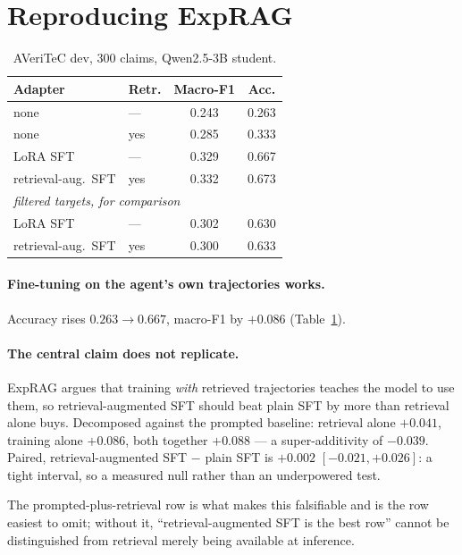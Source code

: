 \documentclass[11pt]{article}
\begin{document}
\section{Reproducing ExpRAG}
\label{sec:exprag}

\begin{table}[t]
\centering\small
\begin{tabular}{llcc}
\toprule
Adapter & Retr. & Macro-F1 & Acc. \\
\midrule
none            & --- & 0.243 & 0.263 \\
none            & yes & 0.285 & 0.333 \\
LoRA SFT        & --- & 0.329 & 0.667 \\
retrieval-aug.\ SFT & yes & 0.332 & 0.673 \\
\midrule
\multicolumn{4}{l}{\emph{filtered targets, for comparison}} \\
LoRA SFT        & --- & 0.302 & 0.630 \\
retrieval-aug.\ SFT & yes & 0.300 & 0.633 \\
\bottomrule
\end{tabular}
\caption{AVeriTeC dev, 300 claims, Qwen2.5-3B student.}
\label{tab:exprag}
\end{table}

\paragraph{Fine-tuning on the agent's own trajectories works.} Accuracy rises
$0.263 \rightarrow 0.667$, macro-F1 by $+0.086$ (Table~\ref{tab:exprag}).

\paragraph{The central claim does not replicate.} ExpRAG argues that training
\emph{with} retrieved trajectories teaches the model to use them, so
retrieval-augmented SFT should beat plain SFT by more than retrieval alone buys.
Decomposed against the prompted baseline: retrieval alone $+0.041$, training
alone $+0.086$, both together $+0.088$ --- a super-additivity of $-0.039$.
Paired, retrieval-augmented SFT $-$ plain SFT is $+0.002$ $[-0.021, +0.026]$:
a tight interval, so a measured null rather than an underpowered test.

The prompted-plus-retrieval row is what makes this falsifiable and is the row
easiest to omit; without it, ``retrieval-augmented SFT is the best row'' cannot
be distinguished from retrieval merely being available at inference.
\end{document}
